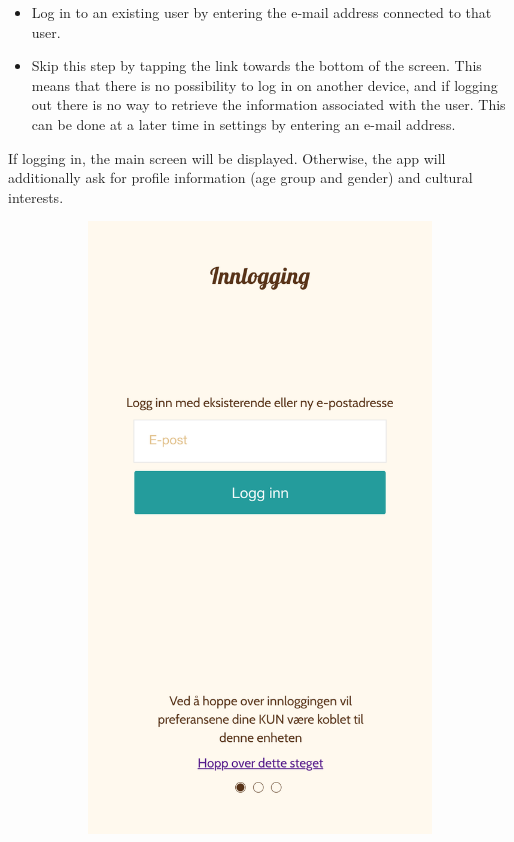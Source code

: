 \begin{appendices}
\begin{itemize}
	\item Log in to an existing user by entering the e-mail address connected to that user. 
	\item Skip this step by tapping the link towards the bottom of the screen. This means that there is no possibility to log in on another device, and if logging out there is no way to retrieve the information associated with the user. This can be done at a later time in settings by entering an e-mail address. 
\end{itemize}
	If logging in, the main screen will be displayed. Otherwise, the app will additionally ask for profile information (age group and gender) and cultural interests. 


	\begin{figure}[h!]
		\centering
		\begin{subfigure}[h]{0.32\textwidth}
			\includegraphics[width=\textwidth]{fig/screenshot_login}

\end{subfigure}
\end{figure}
\end{appendices}
